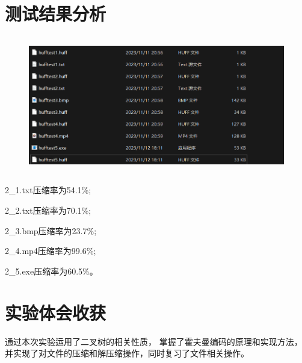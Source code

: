 \documentclass{ctexart}
\begin{document}
	\section{测试结果分析}
	\begin{figure}[H]
		\centering 
		\includegraphics[height=6cm,width=12cm]{2.png}
		\end{figure}
	2\_1.txt压缩率为54.1\%;
	
	2\_2.txt压缩率为70.1\%;

	2\_3.bmp压缩率为23.7\%;
	
	2\_4.mp4压缩率为99.6\%;
	
	2\_5.exe压缩率为60.5\%。
	\section{实验体会收获}

通过本次实验运用了二叉树的相关性质，
掌握了霍夫曼编码的原理和实现方法，并实现了对文件的压缩和解压缩操作，同时复习了文件相关操作。
   
\end{document}
